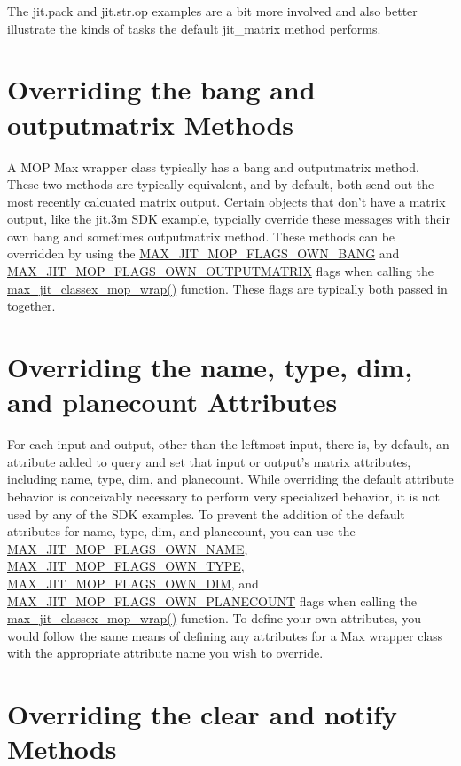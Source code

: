 The jit.pack and jit.str.op examples are a bit more involved and also better illustrate the kinds of tasks the default jit\_\-matrix method performs.\hypertarget{chapter_jit_mopdetails_chapter_jit_mopdetails_overridebang}{}\section{Overriding the bang and outputmatrix Methods}\label{chapter_jit_mopdetails_chapter_jit_mopdetails_overridebang}
A MOP Max wrapper class typically has a bang and outputmatrix method. These two methods are typically equivalent, and by default, both send out the most recently calcuated matrix output. Certain objects that don't have a matrix output, like the jit.3m SDK example, typcially override these messages with their own bang and sometimes outputmatrix method. These methods can be overridden by using the \hyperlink{group__jitter_gae93fd085f28675389848233a82521942}{MAX\_\-JIT\_\-MOP\_\-FLAGS\_\-OWN\_\-BANG} and \hyperlink{group__jitter_ga7c51c91474bdbc40437dbd946df19cc5}{MAX\_\-JIT\_\-MOP\_\-FLAGS\_\-OWN\_\-OUTPUTMATRIX} flags when calling the \hyperlink{group__maxmopmod_ga7e08584771f58ce1fe0b190d27b5759b}{max\_\-jit\_\-classex\_\-mop\_\-wrap()} function. These flags are typically both passed in together.\hypertarget{chapter_jit_mopdetails_chapter_jit_mopdetails_overridemore}{}\section{Overriding the name, type, dim, and planecount Attributes}\label{chapter_jit_mopdetails_chapter_jit_mopdetails_overridemore}
For each input and output, other than the leftmost input, there is, by default, an attribute added to query and set that input or output's matrix attributes, including name, type, dim, and planecount. While overriding the default attribute behavior is conceivably necessary to perform very specialized behavior, it is not used by any of the SDK examples. To prevent the addition of the default attributes for name, type, dim, and planecount, you can use the \hyperlink{group__jitter_ga2da79e2f2413304655b66637eeff0326}{MAX\_\-JIT\_\-MOP\_\-FLAGS\_\-OWN\_\-NAME}, \hyperlink{group__jitter_gaf85d3bada9b15b7c5371e4cbeeffcaeb}{MAX\_\-JIT\_\-MOP\_\-FLAGS\_\-OWN\_\-TYPE}, \hyperlink{group__jitter_gaf138ee8c3a7120b8914c2e815ed013bd}{MAX\_\-JIT\_\-MOP\_\-FLAGS\_\-OWN\_\-DIM}, and \hyperlink{group__jitter_ga77553b6728bd9d5d6d18fe6e4d65a128}{MAX\_\-JIT\_\-MOP\_\-FLAGS\_\-OWN\_\-PLANECOUNT} flags when calling the \hyperlink{group__maxmopmod_ga7e08584771f58ce1fe0b190d27b5759b}{max\_\-jit\_\-classex\_\-mop\_\-wrap()} function. To define your own attributes, you would follow the same means of defining any attributes for a Max wrapper class with the appropriate attribute name you wish to override.\hypertarget{chapter_jit_mopdetails_chapter_jit_mopdetails_overrideclear}{}\section{Overriding the clear and notify Methods}\label{chapter_jit_mopdetails_chapter_jit_mopdetails_overrideclear}
